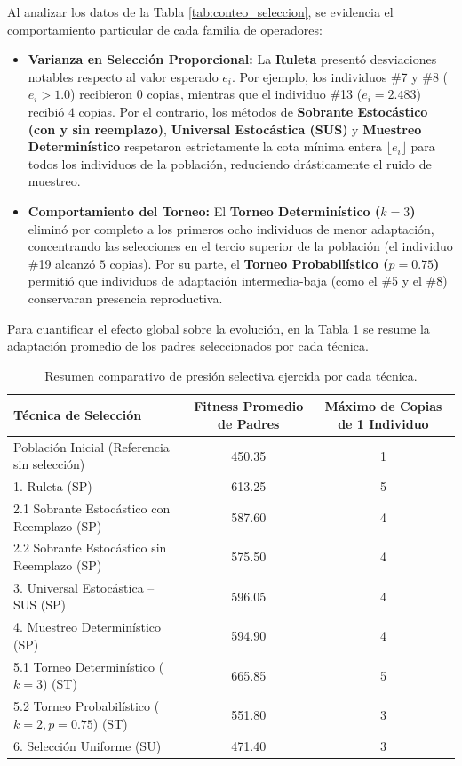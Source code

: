 \documentclass[11pt,letterpaper]{article}
\begin{document}
Al analizar los datos de la Tabla \ref{tab:conteo_seleccion}, se evidencia el comportamiento particular de cada familia de operadores:
\begin{itemize}
    \item \textbf{Varianza en Selección Proporcional:} La \textbf{Ruleta} presentó desviaciones notables respecto al valor esperado $e_i$. Por ejemplo, los individuos \#7 y \#8 ($e_i > 1.0$) recibieron $0$ copias, mientras que el individuo \#13 ($e_i = 2.483$) recibió $4$ copias. Por el contrario, los métodos de \textbf{Sobrante Estocástico (con y sin reemplazo)}, \textbf{Universal Estocástica (SUS)} y \textbf{Muestreo Determinístico} respetaron estrictamente la cota mínima entera $\lfloor e_i \rfloor$ para todos los individuos de la población, reduciendo drásticamente el ruido de muestreo.
    \item \textbf{Comportamiento del Torneo:} El \textbf{Torneo Determinístico ($k=3$)} eliminó por completo a los primeros ocho individuos de menor adaptación, concentrando las selecciones en el tercio superior de la población (el individuo \#19 alcanzó $5$ copias). Por su parte, el \textbf{Torneo Probabilístico ($p=0.75$)} permitió que individuos de adaptación intermedia-baja (como el \#5 y el \#8) conservaran presencia reproductiva.
\end{itemize}

Para cuantificar el efecto global sobre la evolución, en la Tabla \ref{tab:presion_selectiva} se resume la adaptación promedio de los padres seleccionados por cada técnica.

\begin{table}[H]
\centering
\caption{Resumen comparativo de presión selectiva ejercida por cada técnica.}
\label{tab:presion_selectiva}
\begin{tabular}{@{}lcc@{}}
\toprule
\textbf{Técnica de Selección} & \textbf{Fitness Promedio de Padres} & \textbf{Máximo de Copias de 1 Individuo} \\ \midrule
Población Inicial (Referencia sin selección) & 450.35 & 1 \\ \midrule
1. Ruleta (SP)                               & 613.25 & 5 \\
2.1 Sobrante Estocástico con Reemplazo (SP)  & 587.60 & 4 \\
2.2 Sobrante Estocástico sin Reemplazo (SP)  & 575.50 & 4 \\
3. Universal Estocástica -- SUS (SP)         & 596.05 & 4 \\
4. Muestreo Determinístico (SP)              & 594.90 & 4 \\
5.1 Torneo Determinístico ($k=3$) (ST)       & 665.85 & 5 \\
5.2 Torneo Probabilístico ($k=2, p=0.75$) (ST)& 551.80 & 3 \\
6. Selección Uniforme (SU)                   & 471.40 & 3 \\ \bottomrule
\end{tabular}
\end{table}
\end{document}
